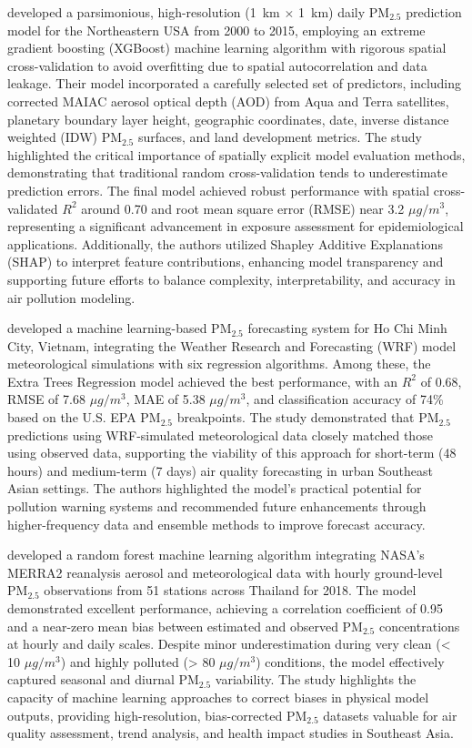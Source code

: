 \documentclass[11pt]{article}
\begin{document}
\citet{stirnberg2020mapping} developed a parsimonious, high-resolution (1~km $\times$ 1~km) daily PM$_{2.5}$ prediction model for the Northeastern USA from 2000 to 2015, employing an extreme gradient boosting (XGBoost) machine learning algorithm with rigorous spatial cross-validation to avoid overfitting due to spatial autocorrelation and data leakage. Their model incorporated a carefully selected set of predictors, including corrected MAIAC aerosol optical depth (AOD) from Aqua and Terra satellites, planetary boundary layer height, geographic coordinates, date, inverse distance weighted (IDW) PM$_{2.5}$ surfaces, and land development metrics. The study highlighted the critical importance of spatially explicit model evaluation methods, demonstrating that traditional random cross-validation tends to underestimate prediction errors. The final model achieved robust performance with spatial cross-validated \( R^{2} \) around 0.70 and root mean square error (RMSE) near 3.2 \(\mu g/m^{3}\), representing a significant advancement in exposure assessment for epidemiological applications. Additionally, the authors utilized Shapley Additive Explanations (SHAP) to interpret feature contributions, enhancing model transparency and supporting future efforts to balance complexity, interpretability, and accuracy in air pollution modeling.

\citet{minh2021pm2} developed a machine learning-based PM$_{2.5}$ forecasting system for Ho Chi Minh City, Vietnam, integrating the Weather Research and Forecasting (WRF) model meteorological simulations with six regression algorithms. Among these, the Extra Trees Regression model achieved the best performance, with an \( R^{2} \) of 0.68, RMSE of 7.68 \(\mu g/m^{3}\), MAE of 5.38 \(\mu g/m^{3}\), and classification accuracy of 74\% based on the U.S. EPA PM$_{2.5}$ breakpoints. The study demonstrated that PM$_{2.5}$ predictions using WRF-simulated meteorological data closely matched those using observed data, supporting the viability of this approach for short-term (48 hours) and medium-term (7 days) air quality forecasting in urban Southeast Asian settings. The authors highlighted the model’s practical potential for pollution warning systems and recommended future enhancements through higher-frequency data and ensemble methods to improve forecast accuracy.

\citet{gupta2021machine} developed a random forest machine learning algorithm integrating NASA's MERRA2 reanalysis aerosol and meteorological data with hourly ground-level PM$_{2.5}$ observations from 51 stations across Thailand for 2018. The model demonstrated excellent performance, achieving a correlation coefficient of 0.95 and a near-zero mean bias between estimated and observed PM$_{2.5}$ concentrations at hourly and daily scales. Despite minor underestimation during very clean (< 10 \(\mu g/m^{3}\)) and highly polluted (> 80 \(\mu g/m^{3}\)) conditions, the model effectively captured seasonal and diurnal PM$_{2.5}$ variability. The study highlights the capacity of machine learning approaches to correct biases in physical model outputs, providing high-resolution, bias-corrected PM$_{2.5}$ datasets valuable for air quality assessment, trend analysis, and health impact studies in Southeast Asia.
\end{document}
